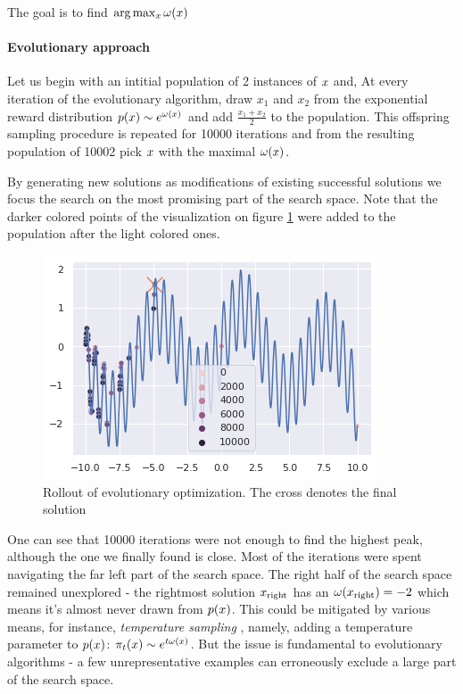 The goal is to find $ \arg\max_x \omega(x) $

\paragraph{Evolutionary approach}

Let us begin with an intitial population of 2 instances of $ x $ and, At every iteration of the evolutionary algorithm, draw $ x_1 $ and $ x_2 $ from the exponential reward distribution $p(x) \sim e^{\omega(x)}$ and add $ \frac{x_1 + x_2}{2} $ to the population.
This offspring sampling procedure is repeated for 10000 iterations and from the resulting population of 10002 pick $ x $ with the maximal $ \omega(x) $.

By generating new solutions as modifications of existing successful solutions we focus the search on the most promising part of the search space. 
Note that the darker colored points of the visualization on figure \ref{fig:neuropt-search} were added to the population after the light colored ones. 

\begin{figure}
    \centering
    \includegraphics[width=0.8\linewidth]{images/neuropt2.png}
    \caption{Rollout of evolutionary optimization. The cross denotes the final solution}
    \label{fig:neuropt-search}
\end{figure}

One can see that 10000 iterations were not enough to find the highest peak, although the one we finally found is close. Most of the iterations were spent navigating the far left part of the search space. 
The right half of the search space remained unexplored - the rightmost solution $ x_\text{right} $ has an $ \omega(x_\text{right})=-2 $ which means it's almost never drawn from $ p(x) $. 
This could be mitigated by various means, for instance, \emph{temperature sampling} \cite{holtzman2019curious}, namely, adding a temperature parameter to $ p(x) $: $\pi_t(x) \sim e^{t\omega(x)}$.
But the issue is fundamental to evolutionary algorithms - a few unrepresentative examples can erroneously exclude a large part of the search space.

